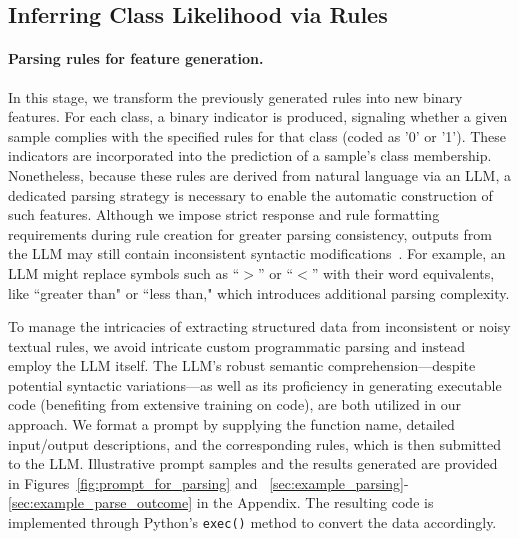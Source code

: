 \subsection{Inferring Class Likelihood via Rules}
\label{Sec:training}

\paragraph{Parsing rules for feature generation.} In this stage, we transform the previously generated rules into new binary features. For each class, a binary indicator is produced, signaling whether a given sample complies with the specified rules for that class (coded as '0' or '1'). These indicators are incorporated into the prediction of a sample's class membership. Nonetheless, because these rules are derived from natural language via an LLM, a dedicated parsing strategy is necessary to enable the automatic construction of such features. Although we impose strict response and rule formatting requirements during rule creation for greater parsing consistency, outputs from the LLM may still contain inconsistent syntactic modifications~\cite{kovavc2023large}. For example, an LLM might replace symbols such as ``$>$” or ``$<$” with their word equivalents, like ``greater than" or ``less than," which introduces additional parsing complexity.

To manage the intricacies of extracting structured data from inconsistent or noisy textual rules, we avoid intricate custom programmatic parsing and instead employ the LLM itself. The LLM's robust semantic comprehension—despite potential syntactic variations—as well as its proficiency in generating executable code (benefiting from extensive training on code), are both utilized in our approach. We format a prompt by supplying the function name, detailed input/output descriptions, and the corresponding rules, which is then submitted to the LLM. Illustrative prompt samples and the results generated are provided in Figures~\ref{fig:prompt_for_parsing} and ~\ref{sec:example_parsing}-\ref{sec:example_parse_outcome} in the Appendix. The resulting code is implemented through Python's \texttt{exec()} method to convert the data accordingly.

\vspace*{-0.12in}

